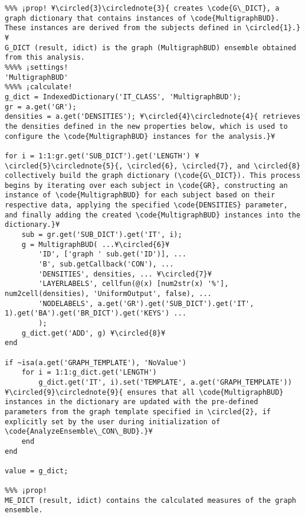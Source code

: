 \documentclass{tufte-handout}
\begin{document}
\begin{lstlisting}
%%% ¡prop! ¥\circled{3}\circlednote{3}{ creates \code{G\_DICT}, a graph dictionary that contains instances of \code{MultigraphBUD}. These instances are derived from the subjects defined in \circled{1}.}¥
G_DICT (result, idict) is the graph (MultigraphBUD) ensemble obtained from this analysis.
%%%% ¡settings!
'MultigraphBUD'
%%%% ¡calculate!
g_dict = IndexedDictionary('IT_CLASS', 'MultigraphBUD');
gr = a.get('GR');
densities = a.get('DENSITIES'); ¥\circled{4}\circlednote{4}{ retrieves the densities defined in the new properties below, which is used to configure the \code{MultigraphBUD} instances for the analysis.}¥

for i = 1:1:gr.get('SUB_DICT').get('LENGTH') ¥\circled{5}\circlednote{5}{, \circled{6}, \circled{7}, and \circled{8} collectively build the graph dictionary (\code{G\_DICT}). This process begins by iterating over each subject in \code{GR}, constructing an instance of \code{MultigraphBUD} for each subject based on their respective data, applying the specified \code{DENSITIES} parameter, and finally adding the created \code{MultigraphBUD} instances into the dictionary.}¥
	sub = gr.get('SUB_DICT').get('IT', i);
    g = MultigraphBUD( ...¥\circled{6}¥
        'ID', ['graph ' sub.get('ID')], ...
        'B', sub.getCallback('CON'), ...
        'DENSITIES', densities, ... ¥\circled{7}¥
        'LAYERLABELS', cellfun(@(x) [num2str(x) '%'], num2cell(densities), 'UniformOutput', false), ...
        'NODELABELS', a.get('GR').get('SUB_DICT').get('IT', 1).get('BA').get('BR_DICT').get('KEYS') ...
        );
    g_dict.get('ADD', g) ¥\circled{8}¥
end

if ~isa(a.get('GRAPH_TEMPLATE'), 'NoValue')
    for i = 1:1:g_dict.get('LENGTH')
        g_dict.get('IT', i).set('TEMPLATE', a.get('GRAPH_TEMPLATE'))  ¥\circled{9}\circlednote{9}{ ensures that all \code{MultigraphBUD} instances in the dictionary are updated with the pre-defined parameters from the graph template specified in \circled{2}, if explicitly set by the user during initialization of \code{AnalyzeEnsemble\_CON\_BUD}.}¥
    end
end

value = g_dict;

%%% ¡prop!
ME_DICT (result, idict) contains the calculated measures of the graph ensemble.
\end{lstlisting}
\end{document}
